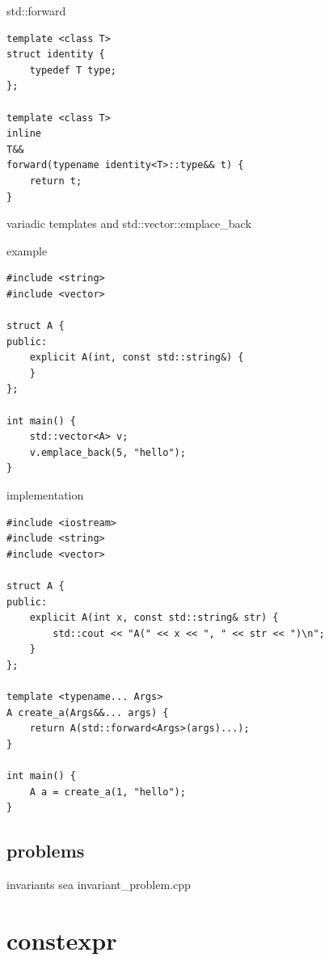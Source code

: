 \documentclass{beamer}
\begin{document}
\begin{frame}[fragile]{std::forward}
  \begin{block}{}
\begin{verbatim}
template <class T>
struct identity {
    typedef T type;
};

template <class T>
inline
T&&
forward(typename identity<T>::type&& t) {
    return t;
}

\end{verbatim}
  \end{block}
\end{frame}

\begin{frame}[fragile]{variadic templates and std::vector::emplace\_back}
  \begin{block}{example}
\begin{verbatim}
#include <string>
#include <vector>

struct A {
public:
    explicit A(int, const std::string&) {
    }
};

int main() {
    std::vector<A> v;
    v.emplace_back(5, "hello");
}

\end{verbatim}
  \end{block}
\end{frame}

\begin{frame}[fragile]
  \begin{block}{implementation}
\scriptsize{
\begin{verbatim}
#include <iostream>
#include <string>
#include <vector>

struct A {
public:
    explicit A(int x, const std::string& str) {
        std::cout << "A(" << x << ", " << str << ")\n";
    }
};

template <typename... Args>
A create_a(Args&&... args) {
    return A(std::forward<Args>(args)...);
}

int main() {
    A a = create_a(1, "hello");
}
\end{verbatim}
}
  \end{block}
\end{frame}

\subsection{problems}
\begin{frame}{invariants}
  sea invariant\_problem.cpp
\end{frame}

\section{constexpr}
\end{document}
